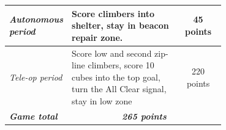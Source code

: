 \begin{figure}[H]
	\begin{minipage}[h]{0.47\linewidth}
	\end{minipage}
	\hfill
	\begin{minipage}[h]{0.47\linewidth}
	\end{minipage}
\end{figure}


\begin{table}[H]
	\begin{center}
		\begin{tabular}{|p{0.2\linewidth}|p{0.5\linewidth}|c|}
			\hline
			\textit{Autonomous period} & Score climbers into shelter, stay in beacon repair zone. & 45 points \\
			\hline
			\textit{Tele-op period} & Score low and second zip-line climbers, score 10 cubes into the top goal, turn the All Clear signal, stay in low zone & 220 points \\
			\hline
			\large{\textbf{\textit{Game total}}} & \multicolumn{2}{|c|}{\large{\textbf{\textit{265 points}}}} \\
			\hline
		\end{tabular}
	\end{center}
\end{table}
